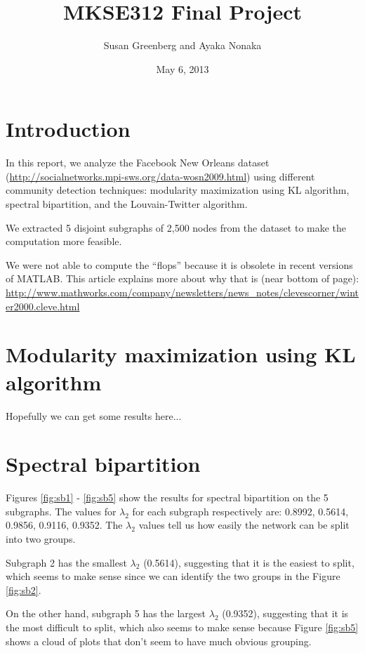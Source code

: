 \documentclass[11pt]{article}
\date{May 6, 2013}
\title{
MKSE312 Final Project
}
\author{
Susan Greenberg and Ayaka Nonaka
}
\begin{document}
\maketitle

\section{Introduction}
In this report, we analyze the Facebook New Orleans dataset (\url{http://socialnetworks.mpi-sws.org/data-wosn2009.html}) using different community detection techniques: modularity maximization using KL algorithm, spectral bipartition, and the Louvain-Twitter algorithm.

We extracted 5 disjoint subgraphs of 2,500 nodes from the dataset to make the computation more feasible.

We were not able to compute the ``flops'' because it is obsolete in recent versions of MATLAB. This article explains more about why that is (near bottom of page): \url{http://www.mathworks.com/company/newsletters/news_notes/clevescorner/winter2000.cleve.html}

\section{Modularity maximization using KL algorithm}
Hopefully we can get some results here...

\section{Spectral bipartition}
Figures \ref{fig:sb1} - \ref{fig:sb5} show the results for spectral bipartition on the 5 subgraphs. The values for $\lambda_2$ for each subgraph respectively are: 0.8992, 0.5614, 0.9856, 0.9116, 0.9352. The $\lambda_2$ values tell us how easily the network can be split into two groups.

Subgraph 2 has the smallest $\lambda_2$ (0.5614), suggesting that it is the easiest to split, which seems to make sense since we can identify the two groups in the Figure \ref{fig:sb2}.

On the other hand, subgraph 5 has the largest $\lambda_2$ (0.9352), suggesting that it is the most difficult to split, which also seems to make sense because Figure \ref{fig:sb5} shows a cloud of plots that don't seem to have much obvious grouping.
\end{document}
